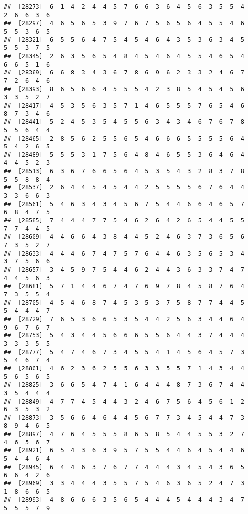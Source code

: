 \documentclass[
]{book}
\begin{document}
\begin{verbatim}
##  [28273]  6  1  4  2  4  4  5  7  6  6  3  6  4  5  6  3  5  5  4  2  6  6  3  6
##  [28297]  4  6  5  6  5  3  9  7  6  7  5  6  5  6  4  5  5  4  6  5  5  3  6  5
##  [28321]  6  5  5  6  4  7  5  4  5  4  6  4  3  5  3  6  3  4  5  5  5  3  7  5
##  [28345]  2  6  3  5  6  5  4  8  4  5  4  6  4  5  5  4  6  5  4  6  6  5  1  6
##  [28369]  6  6  8  3  4  3  6  7  8  6  9  6  2  3  3  2  4  6  7  7  2  6  4  6
##  [28393]  8  6  5  6  6  4  5  5  5  4  2  3  8  5  4  5  4  5  6  3  3  5  2  7
##  [28417]  4  5  3  5  6  3  5  7  1  4  6  5  5  5  7  6  5  4  6  8  7  3  4  6
##  [28441]  5  2  4  5  3  5  4  5  5  6  3  4  3  4  6  7  6  7  8  5  5  6  4  4
##  [28465]  2  8  5  6  2  5  5  6  5  4  6  6  6  5  5  5  5  6  4  5  4  2  6  5
##  [28489]  5  5  5  3  1  7  5  6  4  8  4  6  5  5  3  6  4  6  4  4  4  5  2  3
##  [28513]  6  3  6  7  6  6  5  6  4  5  3  5  4  3  2  8  3  7  8  5  5  8  8  4
##  [28537]  2  6  4  4  5  4  5  4  4  2  5  5  5  5  6  7  6  4  4  3  3  6  6  3
##  [28561]  5  4  6  3  4  3  4  5  6  7  5  4  4  6  6  4  6  5  7  6  8  4  7  5
##  [28585]  7  4  4  4  7  7  5  4  6  2  6  4  2  6  5  4  4  5  5  7  7  4  4  5
##  [28609]  4  4  6  6  4  3  8  4  4  5  2  4  6  3  7  3  6  5  6  7  3  5  2  7
##  [28633]  4  4  4  6  7  4  7  5  7  6  4  4  6  3  5  6  5  3  4  3  7  5  6  6
##  [28657]  3  4  5  9  7  5  4  4  6  2  4  4  3  6  3  3  7  4  7  4  4  5  6  3
##  [28681]  5  7  1  4  4  6  7  4  7  6  9  7  8  4  5  8  7  6  4  7  3  5  5  4
##  [28705]  4  5  4  6  8  7  4  5  3  5  3  7  5  8  7  7  4  4  5  5  4  4  4  7
##  [28729]  7  6  5  3  6  6  5  3  5  4  4  2  5  6  3  4  4  6  4  9  6  7  6  7
##  [28753]  5  4  3  4  4  5  6  6  6  5  5  6  4  4  3  7  4  4  4  3  3  3  5  5
##  [28777]  5  4  7  4  6  7  3  4  5  5  4  1  4  5  6  4  5  7  3  5  4  6  7  4
##  [28801]  4  6  2  3  6  2  5  5  6  3  3  5  5  7  1  4  3  4  4  5  6  5  6  5
##  [28825]  3  6  6  5  4  7  4  1  6  4  4  4  8  7  3  6  7  4  4  3  5  4  4  4
##  [28849]  4  7  7  4  5  4  4  3  2  4  6  7  5  6  4  5  6  1  2  6  3  5  3  2
##  [28873]  3  5  6  6  4  6  4  4  5  6  7  7  3  4  5  4  4  7  3  8  9  4  6  5
##  [28897]  4  7  6  4  5  5  5  8  6  5  8  5  4  4  5  5  3  2  7  4  6  5  6  7
##  [28921]  6  5  4  3  6  3  9  5  7  5  5  4  4  6  4  5  4  4  6  5  4  4  6  4
##  [28945]  6  4  4  6  3  7  6  7  7  4  4  4  3  4  5  4  3  6  5  6  6  4  2  6
##  [28969]  3  3  4  4  4  3  5  5  7  5  4  6  3  6  5  2  4  7  3  1  8  6  6  5
##  [28993]  4  8  6  6  6  3  5  6  5  4  4  4  5  4  4  4  3  4  7  5  5  5  7  9

\end{verbatim}
\end{document}
